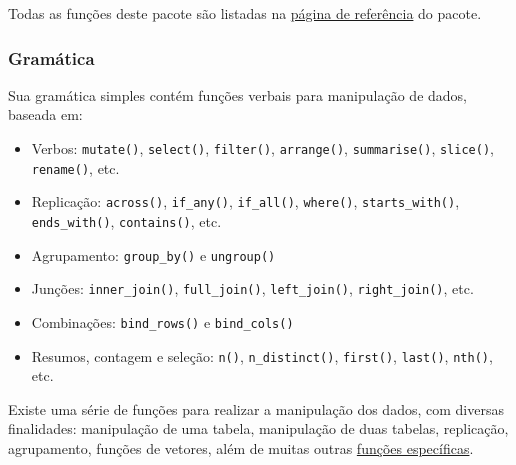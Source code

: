 \documentclass[
]{article}
\providecommand{\tightlist}{%
  \setlength{\itemsep}{0pt}\setlength{\parskip}{0pt}}
\begin{document}
Todas as funções deste pacote são listadas na \href{https://dplyr.tidyverse.org/reference/index.html}{página de referência} do pacote.

\hypertarget{gramuxe1tica}{%
\subsubsection{Gramática}\label{gramuxe1tica}}

Sua gramática simples contém funções verbais para manipulação de dados, baseada em:

\begin{itemize}
\tightlist
\item
  Verbos: \texttt{mutate()}, \texttt{select()}, \texttt{filter()}, \texttt{arrange()}, \texttt{summarise()}, \texttt{slice()}, \texttt{rename()}, etc.
\item
  Replicação: \texttt{across()}, \texttt{if\_any()}, \texttt{if\_all()}, \texttt{where()}, \texttt{starts\_with()}, \texttt{ends\_with()}, \texttt{contains()}, etc.
\item
  Agrupamento: \texttt{group\_by()} e \texttt{ungroup()}
\item
  Junções: \texttt{inner\_join()}, \texttt{full\_join()}, \texttt{left\_join()}, \texttt{right\_join()}, etc.
\item
  Combinações: \texttt{bind\_rows()} e \texttt{bind\_cols()}
\item
  Resumos, contagem e seleção: \texttt{n()}, \texttt{n\_distinct()}, \texttt{first()}, \texttt{last()}, \texttt{nth()}, etc.
\end{itemize}

Existe uma série de funções para realizar a manipulação dos dados, com diversas finalidades: manipulação de uma tabela, manipulação de duas tabelas, replicação, agrupamento, funções de vetores, além de muitas outras \href{https://dplyr.tidyverse.org/reference/index.html}{funções específicas}.
\end{document}
